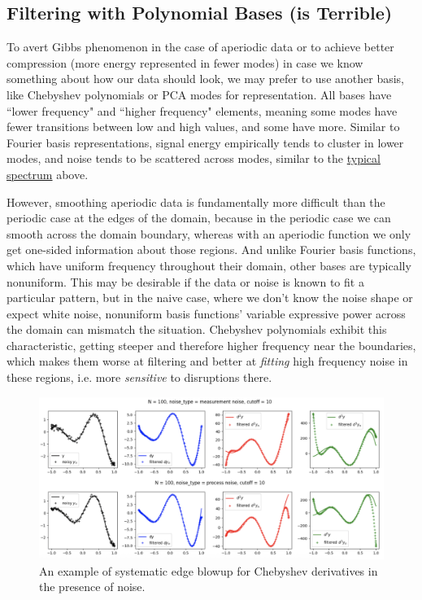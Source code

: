 \documentclass[10pt]{article}
\begin{document}
\subsection{Filtering with Polynomial Bases (is Terrible)}

To avert Gibbs phenomenon in the case of aperiodic data or to achieve better compression (more energy represented in fewer modes) in case we know something about how our data should look, we may prefer to use another basis, like Chebyshev polynomials or PCA modes for representation. All bases have ``lower frequency" and ``higher frequency" elements, meaning some modes have fewer transitions between low and high values, and some have more. Similar to Fourier basis representations, signal energy empirically tends to cluster in lower modes, and noise tends to be scattered across modes, similar to the \hyperref[spectrum]{typical spectrum} above.

However, smoothing aperiodic data is fundamentally more difficult than the periodic case at the edges of the domain, because in the periodic case we can smooth across the domain boundary, whereas with an aperiodic function we only get one-sided information about those regions. And unlike Fourier basis functions, which have uniform frequency throughout their domain, other bases are typically nonuniform. This may be desirable if the data or noise is known to fit a particular pattern, but in the naive case, where we don't know the noise shape or expect white noise, nonuniform basis functions' variable expressive power across the domain can mismatch the situation. Chebyshev polynomials exhibit this characteristic, getting steeper and therefore higher frequency near the boundaries, which makes them worse at filtering and better at \textit{fitting} high frequency noise in these regions, i.e. more \textit{sensitive} to disruptions there.

\begin{figure}[h!]
	\centering
	\includegraphics[width=\textwidth]{chebnoise.png}
	\caption*{An example of systematic edge blowup for Chebyshev derivatives in the presence of noise.}
\end{figure}
\end{document}
